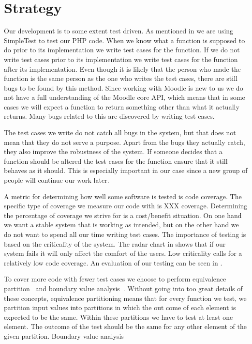 \section{Strategy}
\label{sec:strategy}
Our development is to some extent test driven.
As mentioned in  we are using SimpleTest to test our PHP code.
When we know what a function is supposed to do prior to its implementation we write test cases for the function.
If we do not write test cases prior to its implementation we write test cases for the function after its implementation.
Even though it is likely that the person who made the function is the same person as the one who writes the test cases, there are still bugs to be found by this method.
Since working with Moodle is new to us we do not have a full understanding of the Moodle core API, which means that in some cases we will expect a function to return something other than what it actually returns.
Many bugs related to this are discovered by writing test cases.

The test cases we write do not catch all bugs in the system, but that does not mean that they do not serve a purpose.
Apart from the bugs they actually catch, they also improve the robustness of the system.
If someone decides that a function should be altered the test cases for the function ensure that it still behaves as it should.
This is especially important in our case since a new group of people will continue our work later.

A metric for determining how well some software is tested is code coverage. 
The specific type of coverage we measure our code with is XXX coverage. 
Determining the percentage of coverage we strive for is a cost/benefit situation.
On one hand we want a stable system that is working as intended, but on the other hand we do not want to spend all our time writing test cases.
The importance of testing is based on the criticality of the system.
The radar chart in  shows that if our system fails it will only affect the comfort of the users.
Low criticality calls for a relatively low code coverage.
An evaluation of our testing can be seen in .

To cover more code with fewer test cases we choose to perform equivalence partition~\cite{testbogen_or_slidesfromsecondlecture} and boundary value analysis~\cite{testbogen_or_slidesfromsecondlecture}.
Without going into too great details of these concepts, equivalence partitioning means that for every function we test, we partition input values into partitions in which the out come of each element is expected to be the same.
Within these partitions we have to test at least one element.
The outcome of the test should be the same for any other element of the given partition.
Boundary value analysis 